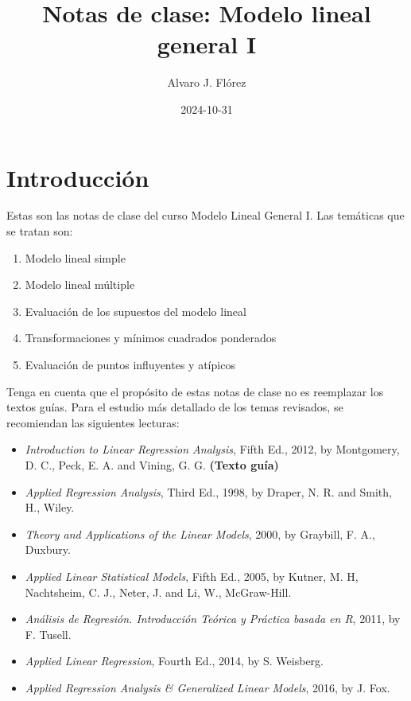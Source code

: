 \documentclass[
]{article}
\title{Notas de clase: Modelo lineal general I}
\author{Alvaro J. Flórez}
\date{2024-10-31}
\providecommand{\tightlist}{%
  \setlength{\itemsep}{0pt}\setlength{\parskip}{0pt}}
\begin{document}
\maketitle

{
\setcounter{tocdepth}{2}
\tableofcontents
}
\hypertarget{introducciuxf3n}{%
\section*{Introducción}\label{introducciuxf3n}}

Estas son las notas de clase del curso Modelo Lineal General I. Las temáticas que se tratan son:

\begin{enumerate}
\def\labelenumi{\arabic{enumi}.}
\tightlist
\item
  Modelo lineal simple
\item
  Modelo lineal múltiple
\item
  Evaluación de los supuestos del modelo lineal
\item
  Transformaciones y mínimos cuadrados ponderados
\item
  Evaluación de puntos influyentes y atípicos
\end{enumerate}

Tenga en cuenta que el propósito de estas notas de clase no es reemplazar los textos guías. Para el estudio más detallado de los temas revisados, se recomiendan las siguientes lecturas:

\begin{itemize}
\tightlist
\item
  \emph{Introduction to Linear Regression Analysis}, Fifth Ed., 2012, by Montgomery, D. C., Peck, E. A. and Vining, G. G. \textbf{(Texto guía)}
\item
  \emph{Applied Regression Analysis}, Third Ed., 1998, by Draper, N. R. and Smith, H., Wiley.
\item
  \emph{Theory and Applications of the Linear Models}, 2000, by Graybill, F. A., Duxbury.
\item
  \emph{Applied Linear Statistical Models}, Fifth Ed., 2005, by Kutner, M. H, Nachtsheim, C. J., Neter, J. and Li, W., McGraw-Hill.
\item
  \emph{Análisis de Regresión. Introducción Teórica y Práctica basada en R}, 2011, by F. Tusell.
\item
  \emph{Applied Linear Regression}, Fourth Ed., 2014, by S. Weisberg.
\item
  \emph{Applied Regression Analysis \& Generalized Linear Models}, 2016, by J. Fox.
\end{itemize}
\end{document}

